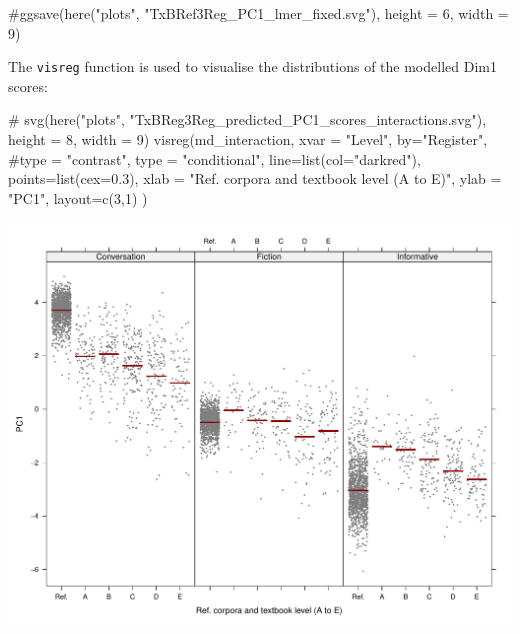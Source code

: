 \documentclass[
  letterpaper,
  DIV=11,
  numbers=noendperiod]{scrreprt}
\newenvironment{Shaded}{\begin{snugshade}}{\end{snugshade}}
\newcommand{\AttributeTok}[1]{\textcolor[rgb]{0.40,0.45,0.13}{#1}}
\newcommand{\CommentTok}[1]{\textcolor[rgb]{0.37,0.37,0.37}{#1}}
\newcommand{\DecValTok}[1]{\textcolor[rgb]{0.68,0.00,0.00}{#1}}
\newcommand{\FloatTok}[1]{\textcolor[rgb]{0.68,0.00,0.00}{#1}}
\newcommand{\FunctionTok}[1]{\textcolor[rgb]{0.28,0.35,0.67}{#1}}
\newcommand{\NormalTok}[1]{\textcolor[rgb]{0.00,0.23,0.31}{#1}}
\newcommand{\StringTok}[1]{\textcolor[rgb]{0.13,0.47,0.30}{#1}}
\begin{document}
\begin{Shaded}
\begin{Highlighting}[]
\CommentTok{\#ggsave(here("plots", "TxBRef3Reg\_PC1\_lmer\_fixed.svg"), height = 6, width = 9)}
\end{Highlighting}
\end{Shaded}

The \texttt{visreg} function is used to visualise the distributions of
the modelled Dim1 scores:

\begin{Shaded}
\begin{Highlighting}[]
\CommentTok{\# svg(here("plots", "TxBReg3Reg\_predicted\_PC1\_scores\_interactions.svg"), height = 8, width = 9)}
\FunctionTok{visreg}\NormalTok{(md\_interaction, }\AttributeTok{xvar =} \StringTok{"Level"}\NormalTok{, }\AttributeTok{by=}\StringTok{"Register"}\NormalTok{, }
       \CommentTok{\#type = "contrast",}
       \AttributeTok{type =} \StringTok{"conditional"}\NormalTok{,}
       \AttributeTok{line=}\FunctionTok{list}\NormalTok{(}\AttributeTok{col=}\StringTok{"darkred"}\NormalTok{), }
       \AttributeTok{points=}\FunctionTok{list}\NormalTok{(}\AttributeTok{cex=}\FloatTok{0.3}\NormalTok{),}
       \AttributeTok{xlab =} \StringTok{"Ref. corpora and textbook level (A to E)"}\NormalTok{, }\AttributeTok{ylab =} \StringTok{"PC1"}\NormalTok{,}
       \AttributeTok{layout=}\FunctionTok{c}\NormalTok{(}\DecValTok{3}\NormalTok{,}\DecValTok{1}\NormalTok{)}
\NormalTok{)}
\end{Highlighting}
\end{Shaded}

\includegraphics{AppendixH_files/figure-pdf/Dim1estimateplots-1.pdf}
\end{document}
